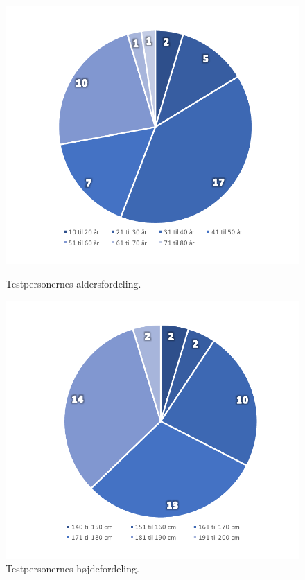 %
\begin{figure}[H]
\centering
\begin{minipage}{.5\textwidth}
  \centering
  \includegraphics[width=\linewidth]{Figure/DatabehandlingSkalaer/CirkelDiagramAlder}
  \caption{Testpersonernes aldersfordeling.}
  \label{fig:CirkelDiagramAlder}
\end{minipage}%
\begin{minipage}{.5\textwidth}
  \centering
  \includegraphics[width=\linewidth]{Figure/DatabehandlingSkalaer/CirkelDiagramHoejde}
  \caption{Testpersonernes højdefordeling.}
  \label{fig:CirkelDiagramHoejde}
\end{minipage}
\end{figure}
